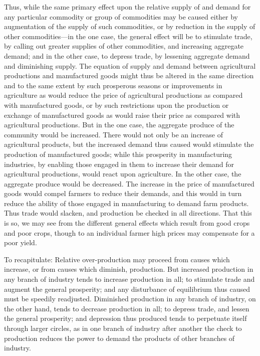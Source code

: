 \documentclass{book}
\begin{document}
Thus, while the same primary effect upon the relative supply of and demand for any particular commodity or group of commodities may be caused either by augmentation of the supply of such commodities, or by reduction in the supply of other commodities—in the one case, the general effect will be to stimulate trade, by calling out greater supplies of other commodities, and increasing aggregate demand; and in the other case, to depress trade, by lessening aggregate demand and diminishing supply. The equation of supply and demand between agricultural productions and manufactured goods might thus be altered in the same direction and to the same extent by such prosperous seasons or improvements in agriculture as would reduce the price of agricultural productions as compared with manufactured goods, or by such restrictions upon the production or exchange of manufactured goods as would raise their price as compared with agricultural productions. But in the one case, the aggregate produce of the community would be increased. There would not only be an increase of agricultural products, but the increased demand thus caused would stimulate the production of manufactured goods; while this prosperity in manufacturing industries, by enabling those engaged in them to increase their demand for agricultural productions, would react upon agriculture. In the other case, the aggregate produce would be decreased. The increase in the price of manufactured goods would compel farmers to reduce their demands, and this would in turn reduce the ability of those engaged in manufacturing to demand farm products. Thus trade would slacken, and production be checked in all directions. That this is so, we may see from the different general effects which result from good crops and poor crops, though to an individual farmer high prices may compensate for a poor yield.

To recapitulate: Relative over-production may proceed from causes which increase, or from causes which diminish, production. But increased production in any branch of industry tends to increase production in all; to stimulate trade and augment the general prosperity; and any disturbance of equilibrium thus caused must be speedily readjusted. Diminished production in any branch of industry, on the other hand, tends to decrease production in all; to depress trade, and lessen the general prosperity; and depression thus produced tends to perpetuate itself through larger circles, as in one branch of industry after another the check to production reduces the power to demand the products of other branches of industry.
\end{document}
